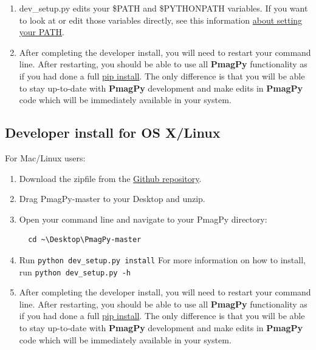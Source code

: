 \documentclass[11pt]{book}
\begin{document}
{\begin{enumerate}
\item dev\_setup.py edits your \$PATH and \$PYTHONPATH variables.  If you want to look at or edit those variables directly, see this information \href{https://www.java.com/en/download/help/path.xml}{about setting your PATH}.

\item After completing the developer install, you will need to restart your command line.  After restarting, you should be able to use all {\bf PmagPy} functionality as if you had done a full \href{#pip_install}{pip install}.  The only difference is that you will be able to stay up-to-date with {\bf PmagPy} development and make edits in {\bf PmagPy} code which will be immediately available in your system.

\end{enumerate}

\subsection{Developer install for OS X/Linux}

For Mac/Linux users:

\begin{enumerate}

\item  Download the zipfile from the \href{https://github.com/PmagPy/PmagPy}{Github repository}.

\item Drag PmagPy-master to your Desktop and unzip.

\item Open your command line and navigate to your PmagPy directory: \begin{verbatim}
  cd ~\Desktop\PmagPy-master
\end{verbatim}

\item Run \verb!python dev_setup.py install!  For more information on how to install, run \verb!python dev_setup.py -h!

\item After completing the developer install, you will need to restart your command line.  After restarting, you should be able to use all {\bf PmagPy} functionality as if you had done a full \href{#pip_install}{pip install}.  The only difference is that you will be able to stay up-to-date with {\bf PmagPy} development and make edits in {\bf PmagPy} code which will be immediately available in your system.

\end{enumerate}

}
\end{document}
